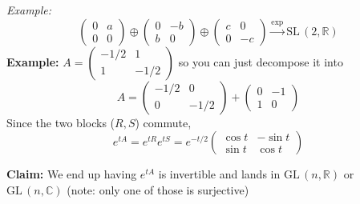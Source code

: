 \documentclass[12pt]{article}
\newcommand{\R}{\mathbb{R}}
\newcommand{\C}{\mathbb{C}}
\newcommand{\SL}{\text{SL}\,}
\newcommand{\GL}{\text{GL}\,}
\begin{document}
    \emph{Example:}
     \[\begin{pmatrix}
        0 & a\\ 
        0 & 0
     \end{pmatrix} \oplus \begin{pmatrix}
        0 & -b\\ 
        b & 0
     \end{pmatrix} \oplus \begin{pmatrix}
        c & 0\\ 
        0 & -c
     \end{pmatrix} \overset{\exp}{\longrightarrow} \SL(2, \R)\]
    \textbf{Example:} $A = \begin{pmatrix}
        -1/2 & 1\\ 
        1 & -1/2
    \end{pmatrix}$ so you can just decompose it into 
    \[A = \begin{pmatrix}
        -1/2 & 0\\ 
        0 & -1/2
    \end{pmatrix} + \begin{pmatrix}
        0 & -1\\ 
        1 & 0
    \end{pmatrix}\]
    Since the two blocks ($R, S$) commute, 
    \[e^{tA} = e^{tR} e^{tS} = e^{-t/2}\begin{pmatrix}
        \cos t & -\sin t\\ 
        \sin t & \cos t
    \end{pmatrix}\]

    \textbf{Claim:} We end up having $e^{tA}$ is invertible and lands in $\GL(n, \R)$ or $\GL(n, \C)$ (note: only one of those is surjective)
\end{document}
